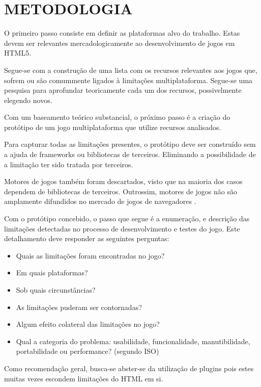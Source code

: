 \documentclass[
12pt,
a4paper,
portuges,
draft
]{report}
\begin{document}

\chapter{METODOLOGIA}
\thispagestyle{myheadings}

O primeiro passo consiste em definir as plataformas alvo do trabalho.
Estas devem ser relevantes mercadologicamente ao desenvolvimento de jogos em HTML5.

Segue-se com a construção de uma lista com os recursos relevantes
aos jogos que, sofrem ou são comummente ligados à
limitações multiplataforma. Segue-se uma pesquisa para aprofundar
teoricamente cada um dos recursos, possivelmente elegendo novos.

Com um baseamento teórico substancial, o próximo passo é a criação
do protótipo de um jogo multiplataforma que utilize recursos
analisados.

Para capturar todas as limitações presentes, o protótipo deve ser construído sem a ajuda de frameworks ou bibliotecas de terceiros. Eliminando a possibilidade de a limitação ter sido tratada  por terceiros.

Motores de jogos também foram descartados, visto que na maioria dos casos dependem de bibliotecas de terceiros. Outrossim, motores de jogos não são amplamente difundidos no mercado de jogos de navegadores \autocite{browserGamesTechnologyAndFuture}.

Com o protótipo concebido, o passo que segue é a enumeração, e
descrição das limitações detectadas no processo de desenvolvimento e
testes do jogo. Este detalhamento deve responder as seguintes perguntas:

\begin{itemize}
\item Quais as limitações foram encontradas no jogo?
\item Em quais plataformas?
\item Sob quais circunstâncias?
\item As limitações puderam ser contornadas?
\item Algum efeito colateral das limitações no jogo?
\item Qual a categoria do problema: usabilidade, funcionalidade, manutibilidade, portabilidade ou performance? (segundo ISO)
\end{itemize}

Como recomendação geral, busca-se abster-se da utilização de plugins pois estes muitas
vezes escondem limitações do HTML em si.
\end{document}
